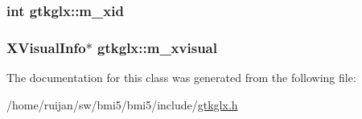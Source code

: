 \hypertarget{classgtkglx_aa75078fd3221c2f5f04421110f9aeb23}{
\subsubsection[{m\-\_\-xid}]{\setlength{\rightskip}{0pt plus 5cm}int gtkglx\-::m\-\_\-xid\hspace{0.3cm}{\ttfamily [private]}}}\label{classgtkglx_aa75078fd3221c2f5f04421110f9aeb23}
\hypertarget{classgtkglx_a5dd470218fb7d409a0b0d8bd9a1254ed}{
\subsubsection[{m\-\_\-xvisual}]{\setlength{\rightskip}{0pt plus 5cm}X\-Visual\-Info$\ast$ gtkglx\-::m\-\_\-xvisual\hspace{0.3cm}{\ttfamily [private]}}}\label{classgtkglx_a5dd470218fb7d409a0b0d8bd9a1254ed}


The documentation for this class was generated from the following file\-:\begin{DoxyCompactItemize}
\item 
/home/ruijan/sw/bmi5/bmi5/include/\hyperlink{gtkglx_8h}{gtkglx.\-h}\end{DoxyCompactItemize}
